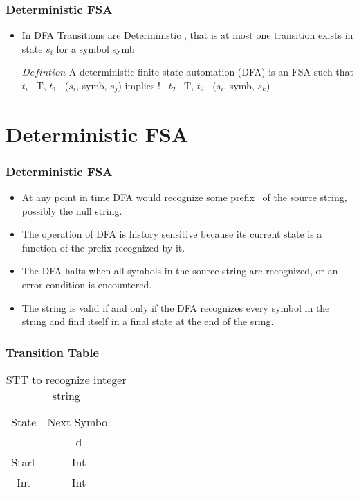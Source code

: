 \documentclass{beamer}
\begin{document}
\begin{frame}
    \frametitle{Deterministic FSA}

    \begin{itemize}
        \item In DFA Transitions are Deterministic , that is at most one transition exists in state $s_i$ for a symbol symb
        \item[\( Defintion \)] A deterministic finite state automation (DFA) is an FSA such that $t_i$ \epsilon \ T, $t_1$ \equiv\ ($s_i$, symb, $s_j$) 
        \newline implies \ni! \ $t_2$ \epsilon \ T, $t_2$ \equiv\ ($s_i$, symb, $s_k$)
    \end{itemize}
    
\end{frame}
\section{Deterministic FSA}
\begin{frame}
    \frametitle{Deterministic FSA}

    \begin{itemize}
        \item At any point in time DFA would recognize some prefix \alpha \ of the source string, possibly the null string.
        \item The operation of DFA is history sensitive because its current state is a function of the prefix recognized by it.
        \item The DFA halts when all symbols in the source string are recognized, or an error condition is encountered.
        \item The string is valid if and only if the DFA recognizes every symbol in the string and find itself in a final state at the end of the sring.
            

    \end{itemize}
\end{frame}

\begin{frame}
    \frametitle{Transition Table}
    \begin{table}
        \centering
        \begin{tabular}{c|cc}
            \toprule
            State & \multicolumn{1}{c}{Next Symbol} \\
            & d  \\
            \midrule
            Start & Int &  \\
            Int & Int &  \\
            \bottomrule
        \end{tabular}
        \caption{STT to recognize integer string}
    \end{table}
\end{frame}
\end{document}
